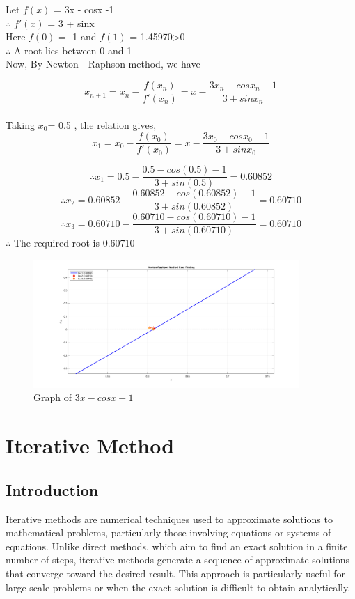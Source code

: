 \documentclass[12pt,a4paper]{article}
\begin{document}
		
		Let \(f(x)\) = 3x - cosx -1 \\
		$\therefore$ \(f'(x)\) = 3 + sinx \\
		Here \(f(0)\) = -1 and \(f(1)\) = 1.45970>0 \\
		$\therefore$ A root lies between 0 and 1 \\
		Now, By Newton - Raphson method, we have 
		
			
		\[
		x_{n+1} = x_n - \frac{f(x_n)}{f'(x_n)} = x - \frac{3x_n - cosx_n - 1}{3 + sin x_n}
		\]
		\\
		Taking $x_{0}$= 0.5 , the relation gives, \\
		\[
		x_{1} = x_0 - \frac{f(x_0)}{f'(x_0)} = x - \frac{3x_0 - cosx_0 - 1}{3 + sin x_0}
		\]
		
		\[
		\therefore x_{1} = 0.5 - \frac{0.5 - cos(0.5) - 1}{3 + sin (0.5)} = 0.60852
		\]
		\[
		\therefore x_{2} = 0.60852 - \frac{0.60852 - cos(0.60852) - 1}{3 + sin (0.60852)} = 0.60710
		\]
				\[
		\therefore x_{3} = 0.60710 - \frac{0.60710 - cos(0.60710) - 1}{3 + sin (0.60710)} = 0.60710
		\]
		$\therefore$ The required root is 0.60710
	
	\begin{figure}[h]
		\centering
		\includegraphics[width=0.9\textwidth]{Nr_ex02.png} %
		\caption{Graph of $3x - cosx -1$}
		\label{x}
	\end{figure}
	

	\newpage
	\section{\centering Iterative Method}

	\subsection{Introduction} \fontsize{18pt}{18pt}\selectfont
	Iterative methods are numerical techniques used to approximate solutions to mathematical problems, particularly those involving equations or systems of equations. Unlike direct methods, which aim to find an exact solution in a finite number of steps, iterative methods generate a sequence of approximate solutions that converge toward the desired result. This approach is particularly useful for large-scale problems or when the exact solution is difficult to obtain analytically.\\
	
\end{document}
